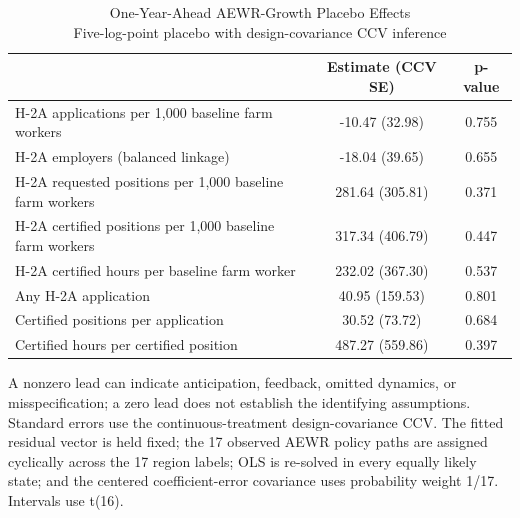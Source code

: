 \begin{table}[!htbp]
\caption*{
{\large One-Year-Ahead AEWR-Growth Placebo Effects} \\
{\small Five-log-point placebo with design-covariance CCV inference}
} 

\fontsize{10.0pt}{12.0pt}\selectfont

\begin{tabular*}{1.0\linewidth}{@{\extracolsep{\fill}}l|cc}
\toprule
  & Estimate (CCV SE) & p-value \\ 
\midrule\addlinespace[2.5pt]
H-2A applications per 1,000 baseline farm workers & -10.47 (32.98) & 0.755 \\
H-2A employers (balanced linkage) & -18.04 (39.65) & 0.655 \\
H-2A requested positions per 1,000 baseline farm workers & 281.64 (305.81) & 0.371 \\
H-2A certified positions per 1,000 baseline farm workers & 317.34 (406.79) & 0.447 \\
H-2A certified hours per baseline farm worker & 232.02 (367.30) & 0.537 \\
Any H-2A application & 40.95 (159.53) & 0.801 \\
Certified positions per application & 30.52 (73.72) & 0.684 \\
Certified hours per certified position & 487.27 (559.86) & 0.397 \\
\bottomrule
\end{tabular*}
\begin{minipage}{\linewidth}
A nonzero lead can indicate anticipation, feedback, omitted dynamics, or misspecification; a zero lead does not establish the identifying assumptions. Standard errors use the continuous-treatment design-covariance CCV. The fitted residual vector is held fixed; the 17 observed AEWR policy paths are assigned cyclically across the 17 region labels; OLS is re-solved in every equally likely state; and the centered coefficient-error covariance uses probability weight 1/17. Intervals use t(16).\\
\end{minipage}
\end{table}
